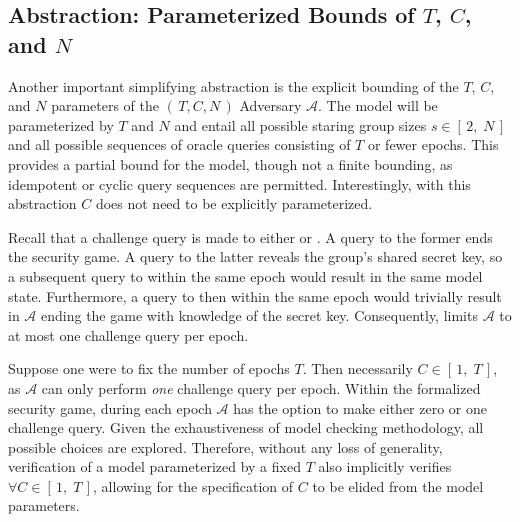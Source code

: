 \documentclass[runningheads]{llncs}
\newcommand{\Adversary}{\ensuremath{\mathcal{A}}\xspace}
\newcommand{\NumericRange}[2]{\ensuremath{\left[\,#1,\; #2\,\right]}\xspace}
\begin{document}

\subsection{Abstraction: Parameterized Bounds of $T$, $C$, and $N$}

Another important simplifying abstraction is the explicit bounding of the $T$, $C$, and $N$ parameters of the \((\,T, C, N\,)\) Adversary \Adversary.
The model will be parameterized by $T$ and $N$ and entail all possible staring group sizes $s \in \NumericRange{2}{N}$ and all possible sequences of oracle queries consisting of $T$ or fewer epochs.
This provides a partial bound for the model, though not a finite bounding, as idempotent or cyclic query sequences are permitted.
Interestingly, with this abstraction $C$ does not need to be explicitly parameterized.

Recall that a challenge query is made to either  or .
A query to the former ends the security game.
A query to the latter reveals the group's shared secret key, so a subsequent query to  within the same epoch would result in the same model state.
Furthermore, a query to  then  within the same epoch would trivially result in \Adversary ending the game with knowledge of the secret key.
Consequently, \CGKAsec limits \Adversary to at most one challenge query per epoch.

Suppose one were to fix the number of epochs $T$.
Then necessarily $C \in \NumericRange{1}{T}$, as \Adversary can only perform \emph{one} challenge query per epoch.
Within the formalized security game, during each epoch \Adversary has the option to make either zero or one challenge query.
Given the exhaustiveness of model checking methodology, all possible choices are explored.
Therefore, without any loss of generality, verification of a model parameterized by a fixed $T$ also implicitly verifies $\forall C \in \NumericRange{1}{T}$, allowing for the specification of $C$ to be elided from the model parameters.
\end{document}
